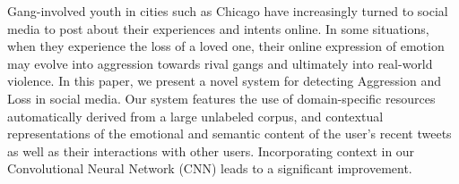 Gang-involved youth in cities such as Chicago have increasingly turned to social media to post about their experiences and intents online. In some situations, when they experience the loss of a loved one, their online expression of emotion may evolve into aggression towards rival gangs and ultimately into real-world violence. In this paper, we present a novel system for detecting Aggression and Loss in social media. Our system features the use of domain-specific resources automatically derived from a large unlabeled corpus, and contextual representations of the emotional and semantic content of the user's recent tweets as well as their interactions with other users. Incorporating context in our Convolutional Neural Network (CNN) leads to a significant improvement.
